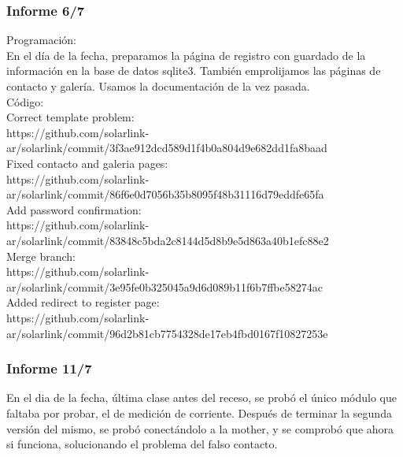 \subsubsection{Informe 6/7}


Programación:\\

En el día de la fecha, preparamos la página de registro con guardado de la información en la base de datos sqlite3. También emprolijamos las páginas de contacto y galería. Usamos la documentación de la vez pasada.\\

Código:\\

Correct template problem:\\
https://github.com/solarlink-\\ar/solarlink/commit/3f3ae912dcd589d1f4b0a804d9e682dd1fa8baad\\

Fixed contacto and galeria pages:\\
https://github.com/solarlink-\\ar/solarlink/commit/86f6e0d7056b35b8095f48b31116d79eddfe65fa\\

Add password confirmation:\\
https://github.com/solarlink-\\ar/solarlink/commit/83848c5bda2c8144d5d8b9e5d863a40b1efc88e2\\

Merge branch:\\
https://github.com/solarlink-\\ar/solarlink/commit/3e95fe0b325045a9d6d089b11f6b7ffbe58274ac\\

Added redirect to register page:\\
https://github.com/solarlink-\\ar/solarlink/commit/96d2b81cb7754328de17eb4fbd0167f10827253e\\

\subsubsection{Informe 11/7}

En el dia de la fecha, última clase antes del receso, se probó el único módulo que faltaba por probar, el de medición de corriente.
Después de terminar la segunda versión del mismo, se probó conectándolo a la mother, y se comprobó que ahora si funciona, solucionando el problema del falso contacto.\\

